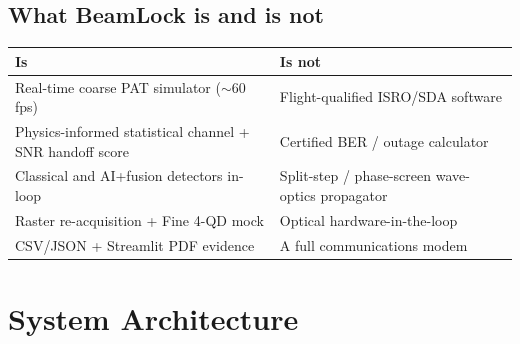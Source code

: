 \documentclass[11pt,a4paper]{article}
\begin{document}
\subsection{What BeamLock is and is not}
\begin{center}
\begin{tabular}{@{}p{}p{}@{}}
\toprule
\textbf{Is} & \textbf{Is not} \\
\midrule
Real-time coarse PAT simulator ($\sim$60\,fps) & Flight-qualified ISRO/SDA software \\
Physics-informed statistical channel + SNR handoff score & Certified BER / outage calculator \\
Classical and AI+fusion detectors in-loop & Split-step / phase-screen wave-optics propagator \\
Raster re-acquisition + Fine 4-QD mock & Optical hardware-in-the-loop \\
CSV/JSON + Streamlit PDF evidence & A full communications modem \\
\bottomrule
\end{tabular}
\end{center}

\section{System Architecture}
\end{document}

